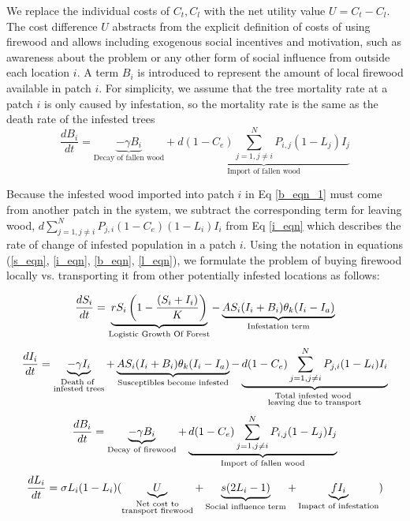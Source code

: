 We replace the individual costs of $C_t, C_l$ with the net utility value $U = C_t - C_l$. The cost difference $U$ abstracts from the explicit definition of costs of using firewood \cite{barlow2014modelling} and allows including exogenous social incentives and motivation, such as awareness about the problem or any other form of social influence from outside each location $i$.
A term $B_i$ is introduced to represent the amount of local firewood available in patch $i$. For simplicity, we assume that the tree mortality rate at a patch $i$ is only caused by infestation, so the mortality rate is the same as the death rate of the infested trees
\begin{equation}
\label{b_eqn_1}
\frac{d B_i}{dt} = \underbrace{-\gamma B_i}_{\text{Decay of fallen wood}} + \underbrace{d (1 - C_e) \sum_{j = 1, j\neq i}^N P_{i,j}  (1 - L_j)I_j}_{\text{Import of fallen wood}}
\end{equation}

Because the infested wood imported into patch $i$ in Eq \ref{b_eqn_1} must come from another patch in the system, we subtract the corresponding term for leaving wood, $d\sum_{j = 1, j\neq i}^N P_{j,i} (1 - C_e) (1 - L_i)I_i$  from Eq \ref{i_eqn} which describes the rate of change of infested population in a patch $i$. Using the notation in equations (\ref{s_eqn}, \ref{i_eqn}, \ref{b_eqn}, \ref{l_eqn}), we formulate the problem of buying firewood locally vs. transporting it from other potentially infested locations as follows: 

\begin{equation}
\frac{d S_i}{dt} = \underbrace{ r S_i\left(1 - \frac{(S_i + I_i)}{K}\right)}_{\text{Logistic Growth Of Forest}} - \underbrace{A S_i (I_i+ B_i)\theta_k(I_i - I_a)}_{\text{Infestation term}}
\protect \label{s_eqn}
\end{equation}
\begin{equation}
\frac{d I_i}{dt} = \underbrace{-\gamma I_i}_{\substack{\text{Death of }\\\text{infested trees}}} + \underbrace{A S_i (I_i+ B_i)\theta_k(I_i - I_a)}_{\text{Susceptibles become infested}}- \underbrace{d(1 - C_e) \sum_{j = 1, j\neq i}^N P_{j,i} (1 - L_i)I_i}_{\substack{\text{Total infested wood }\\\text{leaving due to transport}}}
\protect \label{i_eqn}
\end{equation}
\begin{equation}
\frac{d B_i}{dt} = \underbrace{-\gamma B_i}_{\text{Decay of firewood}} + \underbrace{d(1 - C_e)\sum_{j = 1, j\neq i}^N P_{i,j}  (1 - L_j)I_j}_{\text{Import of fallen wood}}
\protect \label{b_eqn}
\end{equation}
\begin{equation}
\frac{d L_i}{dt} = \sigma L_i (1 -L_i)(\underbrace{U}_{\substack{\text{Net cost to}\\\text{transport firewood}}} + \underbrace{s (2 L_i - 1)}_{\text{Social influence term}} + \underbrace{f I_i}_{\text{Impact of infestation}})  
\protect \label{l_eqn}
\end{equation}


